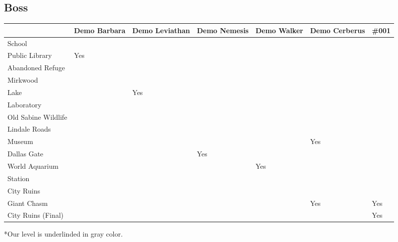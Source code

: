 \newpage

\subsection{Boss}

\vspace*{0.2cm}

\begin{center}
	\begin{tabular}[c]{| p{3.8cm} | p{1.5cm} | p{1.5cm} | p{1.5cm} | p{1.5cm} | p{1.5cm} | p{1cm} |}
		\hline
		& Demo Barbara & Demo Leviathan & Demo Nemesis & Demo Walker & Demo Cerberus & \#001\\
		\hline
		School & & & & & &\\
		\hline
		Public Library & Yes & & & & & \\
		\hline
		Abandoned Refuge & & & & & & \\
		\hline
		Mirkwood & & & & & &\\
		\hline
		Lake & & Yes & & & &\\
		\hline
		Laboratory & & & & & &\\
		\hline
		Old Sabine Wildlife & & & & & &\\
		\hline
		Lindale Roads & & & & & &\\
		\hline
		Museum & & & & & Yes & \\
		\hline
		Dallas Gate & & & Yes & & &\\
		\hline
		World Aquarium & & & & Yes & &\\
		\hline
		Station & & & & && \\
		\hline
		City Ruins & & & & & & \\
		\hline \rowcolor{light-light-gray}
		Giant Chasm & & & & & Yes & Yes\\
		\hline
		City Ruins (Final) & & & & & & Yes\\
		\hline
	\end{tabular}
\end{center}

\vspace*{0.2cm}

*Our level is underlinded in gray color.
